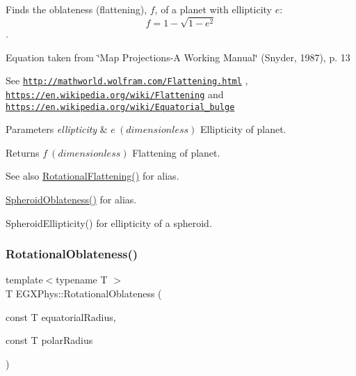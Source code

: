 Finds the oblateness (flattening), $f$, of a planet with ellipticity $e$\+: \[ f = 1 - \sqrt{1-e^2} \]. 

Equation taken from \char`\"{}\+Map Projections-\/\+A Working Manual\char`\"{} (Snyder, 1987), p. 13

See \href{http://mathworld.wolfram.com/Flattening.html}{\tt http\+://mathworld.\+wolfram.\+com/\+Flattening.\+html} , \href{https://en.wikipedia.org/wiki/Flattening}{\tt https\+://en.\+wikipedia.\+org/wiki/\+Flattening} and \href{https://en.wikipedia.org/wiki/Equatorial_bulge}{\tt https\+://en.\+wikipedia.\+org/wiki/\+Equatorial\+\_\+bulge} 
\begin{DoxyParams}{Parameters}
{\em ellipticity} & $ e\ (dimensionless)$ Ellipticity of planet. \\
\hline
\end{DoxyParams}
\begin{DoxyReturn}{Returns}
$ f\ (dimensionless)$ Flattening of planet. 
\end{DoxyReturn}
\begin{DoxySeeAlso}{See also}
\mbox{\hyperlink{group___e_g_x_phys-_astrophysics-_rotational_flattening_ga316b9afb6e1aa940fa96417c6f24ed4d}{Rotational\+Flattening()}} for alias. 

\mbox{\hyperlink{group___e_g_x_math-_geometry-3_d-_spheroid-_flattening_ga8f547f5dd10721862b602c7769eb6116}{Spheroid\+Oblateness()}} for alias. 

Spheroid\+Ellipticity() for ellipticity of a spheroid. 
\end{DoxySeeAlso}
\mbox{\label{group___e_g_x_phys-_astrophysics-_rotational_flattening_ga0bbe606845430e58be5ed34541835f83}} 
\subsubsection{\texorpdfstring{Rotational\+Oblateness()}{RotationalOblateness()}\hspace{0.1cm}{\footnotesize\ttfamily [2/3]}}
{\footnotesize\ttfamily template$<$typename T $>$ \\
T E\+G\+X\+Phys\+::\+Rotational\+Oblateness (\begin{DoxyParamCaption}\item[{const T}]{equatorial\+Radius,  }\item[{const T}]{polar\+Radius }\end{DoxyParamCaption})}



